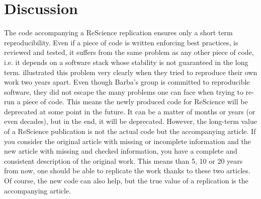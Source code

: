 \documentclass[a4paper,10pt, twocolumn]{article}
\begin{document}
\section*{Discussion}

The code accompanying a ReScience replication ensures only a short term
reproducibility. Even if a piece of code is written enforcing best practices,
is reviewed and tested, it suffers from the same problem as any other piece of
code, i.e. it depends on a software stack whose stability is not guaranteed in
the long term. \citep{Mesnard:2016} illustrated this problem very clearly when
they tried to reproduce their own work two years apart. Even though Barba's
group is committed to reproducible software, they did not escape the many
problems one can face when trying to re-run a piece of code. This means the
newly produced code for ReScience will be deprecated at some point in the
future. It can be a matter of months or years (or even decades), but in the
end, it will be deprecated. However, the long-term value of a ReScience
publication is not the actual code but the accompanying article. If you
consider the original article with missing or incomplete information and the
new article with missing and checked information, you have a complete and
consistent description of the original work. This means than 5, 10 or 20 years
from now, one should be able to replicate the work thanks to these two
articles. Of course, the new code can also help, but the true value of a
replication is the accompanying article.





\renewcommand*{\bibfont}{\footnotesize}
\printbibliography[title=References]
\end{document}
